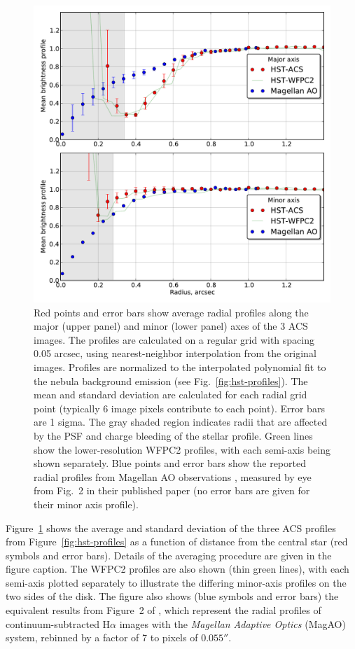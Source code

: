 \documentclass[oneside, 11pt]{article}
\begin{document}
\begin{figure}
  \centering
  \includegraphics[width=\linewidth]{rprofiles-acs-218-354}
  \caption{Red points and error bars show average radial profiles along the major (upper panel) and minor (lower panel) axes of the 3 ACS images.  The profiles  are calculated on a regular grid with spacing 0.05 arcsec, using nearest-neighbor interpolation from the original images.    Profiles are normalized to the interpolated polynomial fit to the nebula background emission (see Fig.~\ref{fig:hst-profiles}).  The mean and standard deviation are calculated for each radial grid point (typically 6 image pixels contribute to each point).   Error bars are 1 sigma.   The gray shaded region indicates radii that are affected by the PSF and charge bleeding of the stellar profile.   Green lines show the lower-resolution WFPC2 profiles, with each semi-axis being shown separately.   Blue points and error bars show the reported radial profiles from Magellan AO observations \citep{Follette:2013a}, measured by eye from Fig.~2 in their published paper (no error bars are given for their minor axis profile).}

  \label{fig:compare}
\end{figure}

Figure~\ref{fig:compare} shows the average and standard deviation of the three ACS profiles from Figure~\ref{fig:hst-profiles} as a function of distance from the central star (red symbols and error bars).  Details of the averaging procedure are given in the figure caption.   The WFPC2 profiles are also shown (thin green lines), with each semi-axis plotted separately to illustrate the differing minor-axis profiles on the two sides of the disk.    The figure also shows (blue symbols and error bars) the equivalent results from Figure~2 of \citet{Follette:2013a}, which represent the radial profiles of continuum-subtracted H\(\alpha\) images with the \textit{Magellan Adaptive Optics} (MagAO) system, rebinned by a factor of 7 to pixels of \(0.055''\). 
\end{document}
